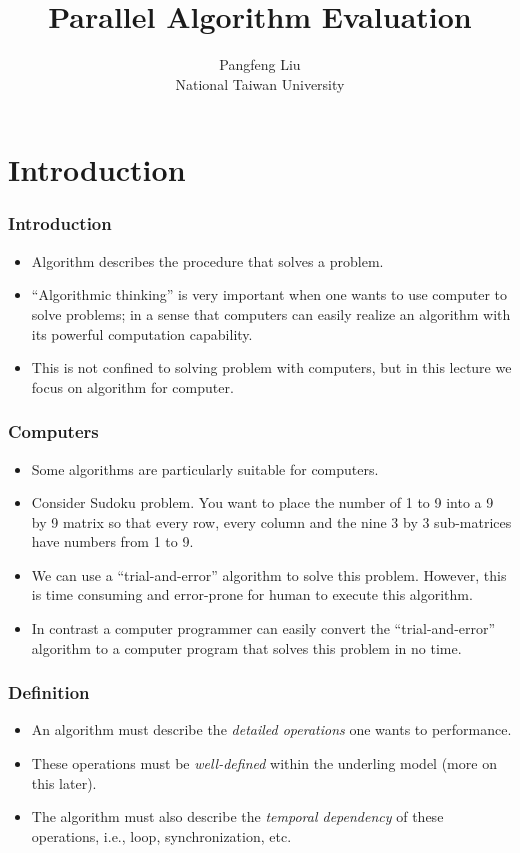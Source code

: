 \documentclass{beamer}
\begin{document}
\begin{CJK}{UTF8}{bsmi}

\title{Parallel Algorithm Evaluation}

\author{Pangfeng Liu \\ National Taiwan University}

\begin{frame}
\titlepage
\end{frame}

\section{Introduction} 

\begin{frame}
\frametitle{Introduction}
\begin{itemize}
\item Algorithm describes the procedure that solves a problem.
\item ``Algorithmic thinking'' is very important when one wants to use
  computer to solve problems; in a sense that computers can easily
  realize an algorithm with its powerful computation capability.
\item This is not confined to solving problem with computers, but in
  this lecture we focus on algorithm for computer.
\end{itemize}
\end{frame}

\begin{frame}
\frametitle{Computers}
\begin{itemize}
\item Some algorithms are particularly suitable for computers.
\item Consider Sudoku problem.  You want to place the number of 1 to 9
  into a 9 by 9 matrix so that every row, every column and the nine 3
  by 3 sub-matrices have numbers from 1 to 9.
\item We can use a ``trial-and-error'' algorithm to solve this
  problem.  However, this is time consuming and error-prone for human
  to execute this algorithm.
\item In contrast a computer programmer can easily convert the
  ``trial-and-error'' algorithm to a computer program that solves this
  problem in no time.
\end{itemize}
\end{frame}

\begin{frame}
\frametitle{Definition}
\begin{itemize}
\item An algorithm must describe the {\em detailed operations} one
  wants to performance.
\item These operations must be {\em well-defined} within the underling
  model (more on this later).
\item The algorithm must also describe the {\em temporal dependency}
  of these operations, i.e., loop, synchronization, etc.
\end{itemize}
\end{frame}


\end{CJK}
\end{document}
